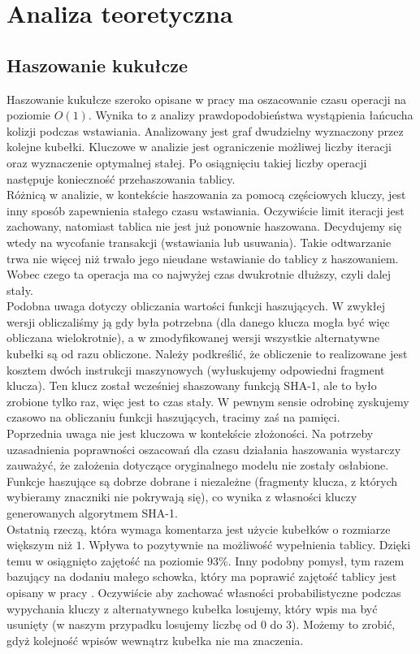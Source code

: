 \documentclass[declaration,shortabstract,masc]{iithesis}
\begin{document}
	\chapter{Analiza teoretyczna}
		\section{Haszowanie kukułcze}
			Haszowanie kukułcze szeroko opisane w pracy \cite{CH} ma oszacowanie czasu operacji na poziomie $O(1)$. Wynika to z analizy prawdopodobieństwa wystąpienia łańcucha kolizji podczas wstawiania. Analizowany jest graf dwudzielny wyznaczony przez kolejne kubełki. Kluczowe w analizie jest ograniczenie możliwej liczby iteracji oraz wyznaczenie optymalnej stałej. Po osiągnięciu takiej liczby operacji następuje konieczność przehaszowania tablicy.\\
			\indent Różnicą w analizie, w kontekście haszowania za pomocą częściowych kluczy, jest inny sposób zapewnienia stałego czasu wstawiania. Oczywiście limit iteracji jest zachowany, natomiast tablica nie jest już ponownie haszowana. Decydujemy się wtedy na wycofanie transakcji (wstawiania lub usuwania). Takie odtwarzanie trwa nie więcej niż trwało jego nieudane wstawianie do tablicy z haszowaniem. Wobec czego ta operacja ma co najwyżej czas dwukrotnie dłuższy, czyli dalej stały.\\
			\indent Podobna uwaga dotyczy obliczania wartości funkcji haszujących. W zwykłej wersji obliczaliśmy ją gdy była potrzebna (dla danego klucza mogła być więc obliczana wielokrotnie), a w zmodyfikowanej wersji wszystkie alternatywne kubełki są od razu obliczone. Należy podkreślić, że obliczenie to realizowane jest kosztem dwóch instrukcji maszynowych (wyłuskujemy odpowiedni fragment klucza). Ten klucz został wcześniej shaszowany funkcją SHA-1, ale to było zrobione tylko raz, więc jest to czas stały. W pewnym sensie odrobinę zyskujemy czasowo na obliczaniu funkcji haszujących, tracimy zaś na pamięci.\\
			\indent Poprzednia uwaga nie jest kluczowa w kontekście złożoności. Na potrzeby uzasadnienia poprawności oszacowań dla czasu działania haszowania wystarczy zauważyć, że założenia dotyczące oryginalnego modelu nie zostały osłabione. Funkcje haszujące są dobrze dobrane i niezależne (fragmenty klucza, z których wybieramy znaczniki nie pokrywają się), co wynika z własności kluczy generowanych algorytmem SHA-1.\\
			\indent Ostatnią rzeczą, która wymaga komentarza jest użycie kubełków o rozmiarze większym niż $1$. Wpływa to pozytywnie na możliwość wypełnienia tablicy. Dzięki temu w \cite{SILT} osiągnięto zajętość na poziomie $93$\%. Inny podobny pomysł, tym razem bazujący na dodaniu małego schowka, który ma poprawić zajętość tablicy jest opisany w pracy \cite{CHwS}. Oczywiście aby zachować własności probabilistyczne podczas wypychania kluczy z alternatywnego kubełka losujemy, który wpis ma być usunięty (w naszym przypadku losujemy liczbę od $0$ do $3$). Możemy to zrobić, gdyż kolejność wpisów wewnątrz kubełka nie ma znaczenia.
\end{document}

